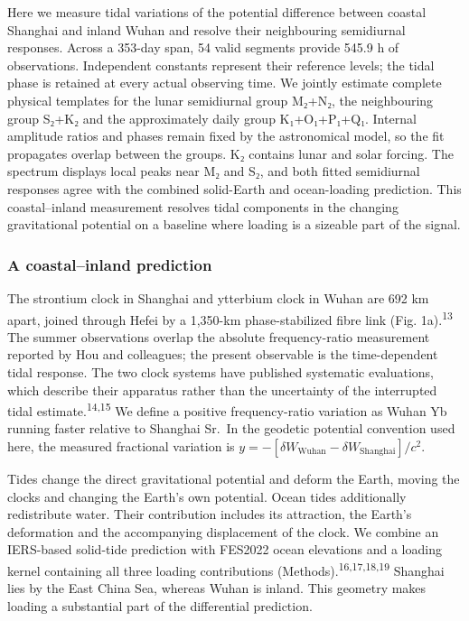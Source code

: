 \documentclass[
  10pt,
  a4paper,
]{article}
\begin{document}
Here we measure tidal variations of the potential difference between
coastal Shanghai and inland Wuhan and resolve their neighbouring
semidiurnal responses. Across a 353-day span, 54 valid segments provide
545.9 h of observations. Independent constants represent their reference
levels; the tidal phase is retained at every actual observing time. We
jointly estimate complete physical templates for the lunar semidiurnal
group M₂+N₂, the neighbouring group S₂+K₂ and the approximately daily
group K₁+O₁+P₁+Q₁. Internal amplitude ratios and phases remain fixed by
the astronomical model, so the fit propagates overlap between the
groups. K₂ contains lunar and solar forcing. The spectrum displays local
peaks near M₂ and S₂, and both fitted semidiurnal responses agree with
the combined solid-Earth and ocean-loading prediction. This
coastal--inland measurement resolves tidal components in the changing
gravitational potential on a baseline where loading is a sizeable part
of the signal.

\hypertarget{a-coastalinland-prediction}{%
\subsubsection{A coastal--inland
prediction}\label{a-coastalinland-prediction}}

The strontium clock in Shanghai and ytterbium clock in Wuhan are 692 km
apart, joined through Hefei by a 1,350-km phase-stabilized fibre link
(Fig. 1a).\textsuperscript{13} The summer observations overlap the
absolute frequency-ratio measurement reported by Hou and colleagues; the
present observable is the time-dependent tidal response. The two clock
systems have published systematic evaluations, which describe their
apparatus rather than the uncertainty of the interrupted tidal
estimate.\textsuperscript{14,15} We define a positive frequency-ratio
variation as Wuhan Yb running faster relative to Shanghai Sr.~In the
geodetic potential convention used here, the measured fractional
variation is
\(y=-[\delta W_{\mathrm{Wuhan}}-\delta W_{\mathrm{Shanghai}}]/c^2\).

Tides change the direct gravitational potential and deform the Earth,
moving the clocks and changing the Earth's own potential. Ocean tides
additionally redistribute water. Their contribution includes its
attraction, the Earth's deformation and the accompanying displacement of
the clock. We combine an IERS-based solid-tide prediction with FES2022
ocean elevations and a loading kernel containing all three loading
contributions (Methods).\textsuperscript{16,17,18,19} Shanghai lies by
the East China Sea, whereas Wuhan is inland. This geometry makes loading
a substantial part of the differential prediction.
\end{document}
